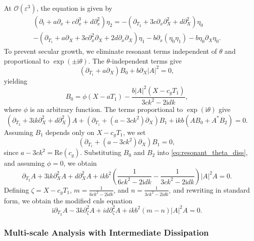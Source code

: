 \documentclass[alpha-refs, 12pt]{wiley-article}
\renewcommand{\O}{\mathcal{O}}
\newcommand{\ui}{\mathrm{i}}
\newcommand{\eps}{\varepsilon}
\begin{document}
At $\O(\eps^3)$, the equation is given by
\begin{multline}
\label{eq:third_order_diss}
\left( \partial_t + a \partial_x + c \partial_x^3 + d \partial_x^2 \right) \eta_2 = - \left( \partial_{T_2} + 3 c \partial_x \partial_X^2 + d \partial_X^2 \right) \eta_0 \\
- \left( \partial_{T_1} + a \partial_X + 3 c \partial_x^2 \partial_X + 2 d \partial_x \partial_X \right) \eta_1 - b \partial_x ( \eta_0 \eta_1 ) - b \eta_0 \partial_X \eta_0.
\end{multline}
To prevent secular growth, we eliminate resonant terms independent of $\theta$ and proportional to $\exp(\pm \ui \theta)$. The $\theta$-independent terms give
\begin{equation}
\label{eq:B0_equation_diss}
  \left( \partial_{T_1} + a \partial_X \right) B_0 + b \partial_X |A|^2 = 0,
\end{equation}
yielding
\[
  B_0 = \phi(X - a T_1) - \frac{b |A|^2 (X - c_g T_1)}{3 c k^2 - 2 \ui d k},
\]
where $\phi$ is an arbitrary function. The terms proportional to $\exp(\ui \theta)$ give
\begin{equation}\label{eq:resonant_theta_diss}
  \left( \partial_{T_2} + 3 \ui k \partial_X^2 + d \partial_X^2 \right) A + \left( \partial_{T_1} + (a - 3 c k^2) \partial_X \right) B_1 + \ui k b \left( A B_0 + A^* B_2 \right) = 0.
\end{equation}
Assuming $B_1$ depends only on $X - c_g T_1$, we set
\[
\left( \partial_{T_1} + (a - 3 c k^2) \partial_X \right) B_1 = 0,
\]
since $a - 3 c k^2 = \text{Re}(c_g)$. Substituting $B_0$ and $B_2$ into \eqref{eq:resonant_theta_diss}, and assuming $\phi = 0$, we obtain
\begin{equation*}%
  \partial_{T_2} A + 3 \ui k \partial_X^2 A + d \partial_X^2 A + i k b^2 \left( \frac{1}{6 c k^2 - 2 \ui d k} - \frac{1}{3 c k^2 - 2 \ui d k} \right) |A|^2 A = 0.
\end{equation*}
Defining $\zeta = X - c_g T_1$, $m = \frac{1}{6 c k^2 - 2 \ui d k}$, and $n = \frac{1}{3 c k^2 - 2 \ui d k}$, and rewriting in standard form, we obtain the modified \acrshort{cnls} equation
\begin{equation}\label{eq:NLS_final_diss}
  \ui \partial_{T_2} A - 3 k \partial_\zeta^2 A + i d \partial_\zeta^2 A + i k b^2 (m - n) |A|^2 A = 0.
\end{equation}

\subsubsection{Multi-scale Analysis with Intermediate Dissipation}
\end{document}
